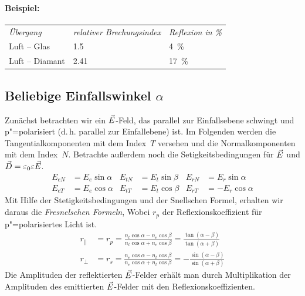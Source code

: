 \paragraph{Beispiel:}
\begin{center}
  \begin{tabular}{lll}
    \emph{Übergang} & \emph{relativer Brechungsindex} & \emph{Reflexion in \%}\\
    Luft -- Glas & \num{1.5} & \SI{4}{\percent} \\
    Luft -- Diamant & \num{2.41} & \SI{17}{\percent}
  \end{tabular}
\end{center}

\subsection[Beliebige Einfallswinkel]{Beliebige Einfallswinkel $\alpha$}
Zunächst betrachten wir ein $\vec{E}$-Feld, das parallel zur
Einfallsebene schwingt und p"=polarisiert (d.\,h. parallel zur Einfallebene)
ist. Im Folgenden werden die Tangentialkomponenten mit dem Index~$T$
versehen und die Normalkomponenten mit dem Index~$N$. Betrachte außerdem
noch die Setigkeitsbedingungen für $\vec{E}$ und
$\vec{D}=\varepsilon_0\varepsilon\vec{E}$.
\begin{align*}
  E_{eN} &= E_e\sin\alpha
  &E_{tN} &= E_t\sin\beta
  &E_{rN} &= E_r\sin\alpha\\
  E_{eT} &= E_e\cos\alpha
  &E_{tT} &= E_t\cos\beta
  &E_{rT} &= -E_r\cos\alpha
\end{align*}
Mit Hilfe der Stetigkeitsbedingungen und der Snellschen Formel,
erhalten wir daraus die 
\emph{Fresnelschen Formeln}, 
Wobei $r_p$ der Reflexionskoeffizient für p"=polarisiertes Licht ist. 
\begin{align}
  r_{\parallel} 
  &= r_p
    = \frac
    {n_t\cos\alpha - n_e\cos\beta}
    {n_t\cos\alpha + n_e\cos\beta}
    = \frac
    {\tan(\alpha - \beta)}
    {\tan(\alpha + \beta)}\label{FF1}\\
  r_{\bot}
  &=r_s
    = \frac
    {n_e\cos\alpha - n_t\cos\beta}
    {n_e\cos\alpha + n_t\cos\beta}
    = -\frac
    {\sin(\alpha - \beta)}
    {\sin(\alpha + \beta)}\label{FF2}
\end{align}
Die Amplituden der reflektierten $\vec{E}$-Felder erhält man durch
Multiplikation der Amplituden des emittierten $\vec{E}$-Felder mit den
Reflexionskoeffizienten.

